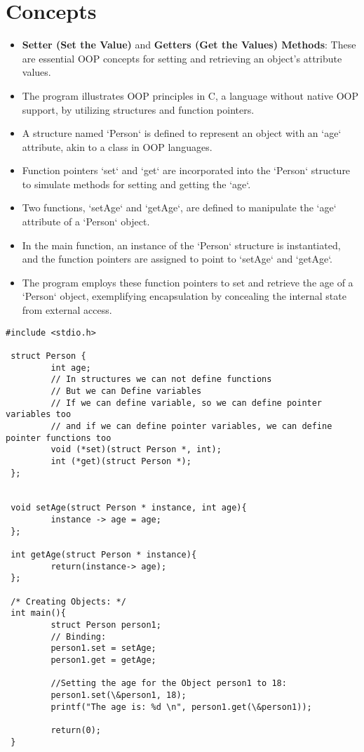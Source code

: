 \section{Concepts}
\begin{itemize}
    \item \textbf{Setter (Set the Value)} and \textbf{Getters (Get the Values) Methods}: These are essential OOP concepts for setting and retrieving an object's attribute values.
    \item The program illustrates OOP principles in C, a language without native OOP support, by utilizing structures and function pointers.
    \item A structure named `Person` is defined to represent an object with an `age` attribute, akin to a class in OOP languages.
    \item Function pointers `set` and `get` are incorporated into the `Person` structure to simulate methods for setting and getting the `age`.
    \item Two functions, `setAge` and `getAge`, are defined to manipulate the `age` attribute of a `Person` object.
    \item In the main function, an instance of the `Person` structure is instantiated, and the function pointers are assigned to point to `setAge` and `getAge`.
    \item The program employs these function pointers to set and retrieve the age of a `Person` object, exemplifying encapsulation by concealing the internal state from external access.
\end{itemize}
\break

\begin{lstlisting}
#include <stdio.h>

 struct Person {
         int age;
         // In structures we can not define functions
         // But we can Define variables
         // If we can define variable, so we can define pointer variables too
         // and if we can define pointer variables, we can define pointer functions too
         void (*set)(struct Person *, int);
         int (*get)(struct Person *);
 };


 void setAge(struct Person * instance, int age){
         instance -> age = age;
 };

 int getAge(struct Person * instance){
         return(instance-> age);
 };

 /* Creating Objects: */
 int main(){
         struct Person person1;
         // Binding:
         person1.set = setAge;
         person1.get = getAge;

         //Setting the age for the Object person1 to 18:
         person1.set(\&person1, 18);
         printf("The age is: %d \n", person1.get(\&person1));

         return(0);
 }

\end{lstlisting}


